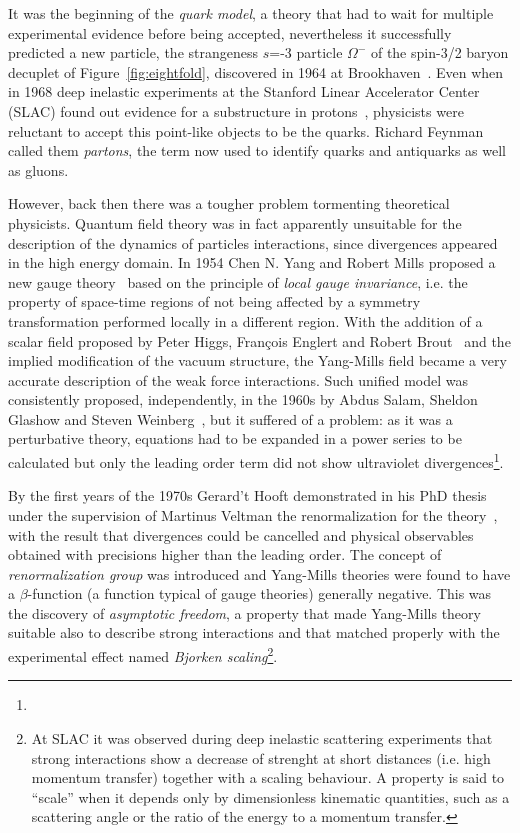 It was the beginning of the {\it quark model}, a theory that had to 
wait for multiple experimental evidence before being accepted,
nevertheless it successfully predicted a new particle, the strangeness $s$=-3 
particle $\Omega^{-}$ of the spin-3/2 baryon decuplet of Figure~\ref{fig:eightfold},
discovered in 1964 at Brookhaven~\cite{PhysRevLett.12.204}. 
Even when in 1968 deep inelastic experiments at the Stanford 
Linear Accelerator Center (SLAC) found out evidence for a 
substructure in protons~\cite{PhysRevLett.23.930,PhysRevLett.23.935}, physicists were reluctant to accept 
this point-like objects to be the quarks. Richard Feynman called 
them \textit{partons}, the term now used to identify quarks 
and antiquarks as well as gluons.

However, back then there was a tougher problem tormenting theoretical physicists. 
Quantum field theory was in fact apparently unsuitable for the description 
of the dynamics of particles interactions, since divergences appeared in the 
high energy domain. In 1954 Chen N. Yang and Robert Mills proposed a new gauge 
theory~\cite{PhysRev.96.191} based on the principle of {\it local gauge invariance},
i.e. the property of space-time regions of not being affected 
by a symmetry transformation performed 
locally in a different region. With the addition of a scalar 
field proposed by Peter Higgs, 
Fran\c{c}ois Englert and Robert 
Brout~\cite{PhysRevLett.13.321,PhysRevLett.13.508} and the implied 
modification of the vacuum structure, the Yang-Mills field 
became a very accurate description of the weak force interactions. 
Such unified model was consistently proposed, independently, in the 1960s 
by Abdus Salam, Sheldon Glashow and Steven 
Weinberg~\cite{Glashow1961579,PhysRevLett.19.1264}, but it suffered of a problem: 
as it was a perturbative theory, equations 
had to be expanded in a power series to be calculated but only the leading order 
term did not show ultraviolet divergences\footnote{}.

By the first years of the 1970s Gerard't Hooft demonstrated in his
PhD thesis under the supervision of  Martinus Veltman the
renormalization for the theory~\cite{tHooft1971173,Hooft1971167}, 
with the result that divergences could be 
cancelled and physical observables obtained with precisions higher than the 
leading order. 
The concept of \textit{renormalization group} was introduced and 
Yang-Mills theories were found to have a $\beta$-function (a function 
typical of gauge theories) generally negative. This was the discovery 
of \textit{asymptotic freedom}, a property that made Yang-Mills theory 
suitable also to describe strong interactions and that matched properly 
with the experimental effect named \textit{Bjorken scaling}\footnote{At 
SLAC it was observed during deep inelastic scattering experiments that 
strong interactions show a decrease of strenght at short distances (i.e. 
high momentum transfer) together with a scaling behaviour. A property is 
said to ``scale'' when it depends only by dimensionless kinematic quantities, 
such as a scattering angle or the ratio of the energy to a momentum transfer.}. 

